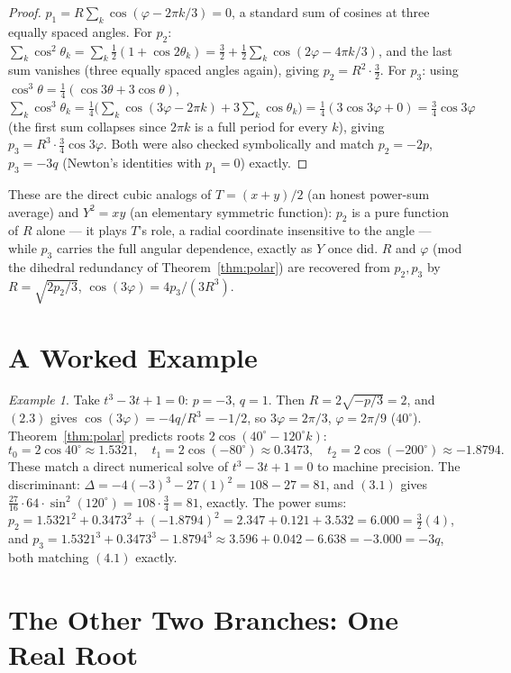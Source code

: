 \documentclass[11pt]{amsart}
\theoremstyle{remark}
\newtheorem*{example}{Example}
\begin{document}
\begin{proof}
$p_1=R\sum_k\cos(\varphi-2\pi k/3)=0$, a standard sum of cosines at three equally spaced angles. For $p_2$: $\sum_k\cos^2\theta_k=\sum_k\tfrac12(1+\cos2\theta_k)=\tfrac32+\tfrac12\sum_k\cos(2\varphi-4\pi k/3)$, and the last sum vanishes (three equally spaced angles again), giving $p_2=R^2\cdot\tfrac32$. For $p_3$: using $\cos^3\theta=\tfrac14(\cos3\theta+3\cos\theta)$, $\sum_k\cos^3\theta_k=\tfrac14\bigl(\sum_k\cos(3\varphi-2\pi k)+3\sum_k\cos\theta_k\bigr)=\tfrac14(3\cos3\varphi+0)=\tfrac34\cos3\varphi$ (the first sum collapses since $2\pi k$ is a full period for every $k$), giving $p_3=R^3\cdot\tfrac34\cos3\varphi$. Both were also checked symbolically and match $p_2=-2p$, $p_3=-3q$ (Newton's identities with $p_1=0$) exactly.
\end{proof}

These are the direct cubic analogs of $T=(x+y)/2$ (an honest power-sum average) and $Y^2=xy$ (an elementary symmetric function): $p_2$ is a pure function of $R$ alone --- it plays $T$'s role, a radial coordinate insensitive to the angle --- while $p_3$ carries the full angular dependence, exactly as $Y$ once did. $R$ and $\varphi$ (mod the dihedral redundancy of Theorem~\ref{thm:polar}) are recovered from $p_2,p_3$ by $R=\sqrt{2p_2/3}$, $\cos(3\varphi)=4p_3/(3R^3)$.

\section{A Worked Example}

\begin{example}
Take $t^3-3t+1=0$: $p=-3$, $q=1$. Then $R=2\sqrt{-p/3}=2$, and $(2.3)$ gives $\cos(3\varphi)=-4q/R^3=-1/2$, so $3\varphi=2\pi/3$, $\varphi=2\pi/9$ ($40^\circ$). Theorem~\ref{thm:polar} predicts roots $2\cos(40^\circ-120^\circ k)$:
\[
t_0=2\cos40^\circ\approx1.5321,\quad t_1=2\cos(-80^\circ)\approx0.3473,\quad t_2=2\cos(-200^\circ)\approx-1.8794.
\]
These match a direct numerical solve of $t^3-3t+1=0$ to machine precision. The discriminant: $\Delta=-4(-3)^3-27(1)^2=108-27=81$, and $(3.1)$ gives $\tfrac{27}{16}\cdot64\cdot\sin^2(120^\circ)=108\cdot\tfrac34=81$, exactly. The power sums: $p_2=1.5321^2+0.3473^2+(-1.8794)^2=2.347+0.121+3.532=6.000=\tfrac32(4)$, and $p_3=1.5321^3+0.3473^3-1.8794^3\approx3.596+0.042-6.638=-3.000=-3q$, both matching $(4.1)$ exactly.
\end{example}

\section{The Other Two Branches: One Real Root}
\end{document}
